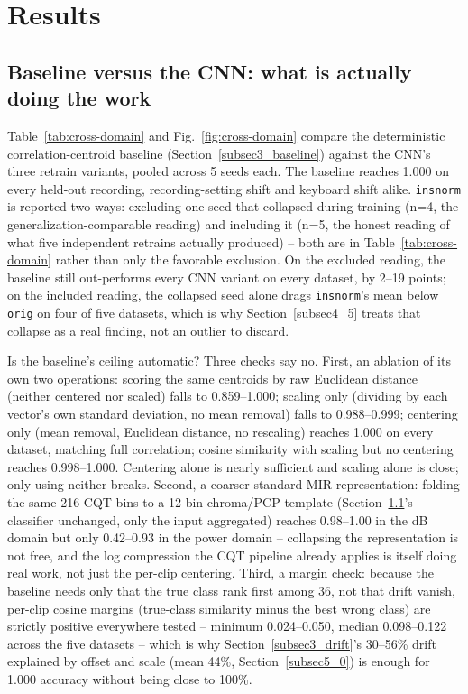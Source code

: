 \documentclass[pdflatex,sn-mathphys-num,iicol]{sn-jnl}
\theoremstyle{thmstyleone}
\theoremstyle{thmstyletwo}
\theoremstyle{thmstylethree}
\begin{document}
\section{Results}\label{sec4}

\subsection{Baseline versus the CNN: what is actually doing the work}\label{subsec4_1}

Table~\ref{tab:cross-domain} and Fig.~\ref{fig:cross-domain} compare the deterministic correlation-centroid baseline (Section~\ref{subsec3_baseline}) against the CNN's three retrain variants, pooled across 5 seeds each. The baseline reaches 1.000 on every held-out recording, recording-setting shift and keyboard shift alike. \texttt{insnorm} is reported two ways: excluding one seed that collapsed during training (n=4, the generalization-comparable reading) and including it (n=5, the honest reading of what five independent retrains actually produced) -- both are in Table~\ref{tab:cross-domain} rather than only the favorable exclusion. On the excluded reading, the baseline still out-performs every CNN variant on every dataset, by 2--19 points; on the included reading, the collapsed seed alone drags \texttt{insnorm}'s mean below \texttt{orig} on four of five datasets, which is why Section~\ref{subsec4_5} treats that collapse as a real finding, not an outlier to discard.

Is the baseline's ceiling automatic? Three checks say no. First, an ablation of its own two operations: scoring the same centroids by raw Euclidean distance (neither centered nor scaled) falls to 0.859--1.000; scaling only (dividing by each vector's own standard deviation, no mean removal) falls to 0.988--0.999; centering only (mean removal, Euclidean distance, no rescaling) reaches 1.000 on every dataset, matching full correlation; cosine similarity with scaling but no centering reaches 0.998--1.000. Centering alone is nearly sufficient and scaling alone is close; only using neither breaks. Second, a coarser standard-MIR representation: folding the same 216 CQT bins to a 12-bin chroma/PCP template (Section~\ref{subsec4_1}'s classifier unchanged, only the input aggregated) reaches 0.98--1.00 in the dB domain but only 0.42--0.93 in the power domain -- collapsing the representation is not free, and the log compression the CQT pipeline already applies is itself doing real work, not just the per-clip centering. Third, a margin check: because the baseline needs only that the true class rank first among 36, not that drift vanish, per-clip cosine margins (true-class similarity minus the best wrong class) are strictly positive everywhere tested -- minimum 0.024--0.050, median 0.098--0.122 across the five datasets -- which is why Section~\ref{subsec3_drift}'s 30--56\% drift explained by offset and scale (mean 44\%, Section~\ref{subsec5_0}) is enough for 1.000 accuracy without being close to 100\%.
\end{document}
